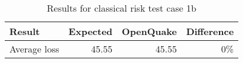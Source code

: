 \begin{table}[htbp]

\centering
\begin{tabular}{ l r r r }

\hline
\rowcolor{anti-flashwhite}
\bf{Result} & \bf{Expected} & \bf{OpenQuake} & \bf{Difference}\\
\hline
Average loss & 45.55 & 45.55 & 0\% \\
\hline
\end{tabular}

\caption{Results for classical risk test case 1b}
\label{tab:result-classical-risk-1b}
\end{table}